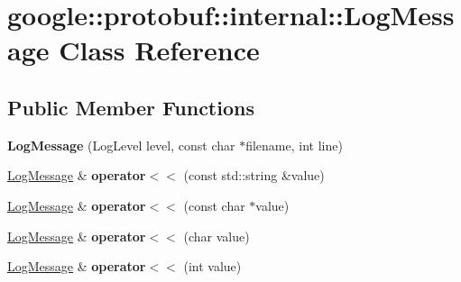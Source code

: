 \hypertarget{classgoogle_1_1protobuf_1_1internal_1_1LogMessage}{}\section{google\+:\+:protobuf\+:\+:internal\+:\+:Log\+Message Class Reference}
\label{classgoogle_1_1protobuf_1_1internal_1_1LogMessage}
\subsection*{Public Member Functions}
\begin{DoxyCompactItemize}
\item 
\mbox{\label{classgoogle_1_1protobuf_1_1internal_1_1LogMessage_a261b956892debe132ede802948444a5e}} 
{\bfseries Log\+Message} (Log\+Level level, const char $\ast$filename, int line)
\item 
\mbox{\label{classgoogle_1_1protobuf_1_1internal_1_1LogMessage_aeea41f683052eb1991f4410170c73aa5}} 
\hyperlink{classgoogle_1_1protobuf_1_1internal_1_1LogMessage}{Log\+Message} \& {\bfseries operator$<$$<$} (const std\+::string \&value)
\item 
\mbox{\label{classgoogle_1_1protobuf_1_1internal_1_1LogMessage_ad5c503c3c81d0186424b879256f4f8fa}} 
\hyperlink{classgoogle_1_1protobuf_1_1internal_1_1LogMessage}{Log\+Message} \& {\bfseries operator$<$$<$} (const char $\ast$value)
\item 
\mbox{\label{classgoogle_1_1protobuf_1_1internal_1_1LogMessage_a7b1d73c6cf780114bf229373bc7f2b65}} 
\hyperlink{classgoogle_1_1protobuf_1_1internal_1_1LogMessage}{Log\+Message} \& {\bfseries operator$<$$<$} (char value)
\item 
\mbox{\label{classgoogle_1_1protobuf_1_1internal_1_1LogMessage_a9d1a9708815ac3257433145d1c3e76d8}} 
\hyperlink{classgoogle_1_1protobuf_1_1internal_1_1LogMessage}{Log\+Message} \& {\bfseries operator$<$$<$} (int value)
\item 
\mbox{\label{classgoogle_1_1protobuf_1_1internal_1_1LogMessage_acb7f1fe7f5b86ccac812b51b20585b0d}} 

\end{DoxyCompactItemize}
